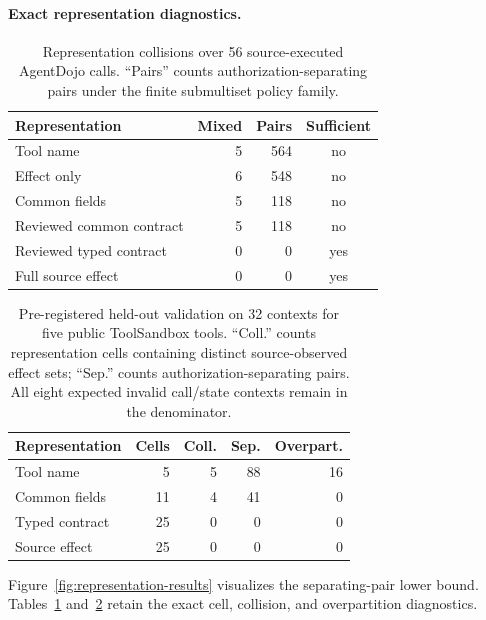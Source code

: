 \documentclass[letterpaper,twocolumn,10pt]{article}
\theoremstyle{definition}
\begin{document}
\paragraph{Exact representation diagnostics.}
\begin{table}[t]
\centering
\small
\setlength{\tabcolsep}{3.5pt}
\caption{Representation collisions over 56 source-executed AgentDojo calls.
``Pairs'' counts authorization-separating pairs under the finite submultiset
policy family.}
\label{tab:representation-collisions}
\begin{tabular}{lrrc}
\toprule
Representation & Mixed & Pairs & Sufficient \\
\midrule
Tool name & 5 & 564 & no \\
Effect only & 6 & 548 & no \\
Common fields & 5 & 118 & no \\
Reviewed common contract & 5 & 118 & no \\
Reviewed typed contract & 0 & 0 & yes \\
Full source effect & 0 & 0 & yes \\
\bottomrule
\end{tabular}
\end{table}

\begin{table}[t]
\centering
\small
\setlength{\tabcolsep}{3.5pt}
\caption{Pre-registered held-out validation on 32 contexts for five public
ToolSandbox tools. ``Coll.'' counts representation cells containing distinct
source-observed effect sets; ``Sep.'' counts authorization-separating pairs.
All eight expected invalid call/state contexts remain in the denominator.}
\label{tab:toolsandbox-heldout}
\begin{tabular}{lrrrr}
\toprule
Representation & Cells & Coll. & Sep. & Overpart. \\
\midrule
Tool name & 5 & 5 & 88 & 16 \\
Common fields & 11 & 4 & 41 & 0 \\
Typed contract & 25 & 0 & 0 & 0 \\
Source effect & 25 & 0 & 0 & 0 \\
\bottomrule
\end{tabular}
\end{table}

Figure~\ref{fig:representation-results} visualizes the separating-pair lower
bound.  Tables~\ref{tab:representation-collisions}
and~\ref{tab:toolsandbox-heldout} retain the exact cell, collision, and
overpartition diagnostics.
\end{document}
